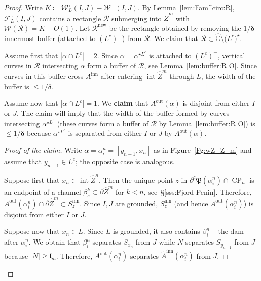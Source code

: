\documentclass{amsart}
\newcommand{\1}{{\mathbb 1 }}
\newcommand{\Fam}{{\mathcal F}}
\newcommand{\Width}{{\mathcal W}}
\newcommand\RR{\mathcal{R}}
\newcommand\intr{\operatorname{int}}
\newcommand{\wZ}{{\widehat Z}}
\newcommand{\str}{{\star}}
\newcommand{\length}{{\mathfrak l}}
\newcommand\inn{{\operatorname{inn}}}
\newcommand\out{{\operatorname{out}}}
\newcommand\new{{\operatorname{new}}}
\newcommand{\wC}{\widehat{\mathbb{C}}}
\theoremstyle{remark}
\numberwithin{equation}{section}
\theoremstyle{definition}
\newcommand{\Penin}{{\mathfrak P}}
\newcommand{\CP}{{\operatorname{CP}}}
\newcommand{\bdelta}{{\boldsymbol{ \delta}}}
\begin{document}
\begin{proof} Write $K\coloneqq\Width^\circ_L(I,J)-\Width^+(I,J)$. By Lemma~\ref{lem:Fam^circ:R}, $\Fam^\circ_L(I,J)$ contains a rectangle $\RR$ submerging into $\wZ^m$ with $\Width(\RR)=K-O(1)$. Let $\RR^\new$ be the rectangle obtained by removing the $1/\bdelta$ innermost buffer (attached to $(L^c)^-$) from $\RR$. We claim that $\RR\subset \wC \setminus \big(L^c\big)^{\str}$.  

Assume first that $|\alpha\cap L^c|=2$. Since $\alpha=\alpha^{\str L^c}$ is attached to $(L^c)^-$, vertical curves in $\RR$ intersecting $\alpha$ form a buffer of $\RR$, see Lemma~\ref{lem:buffer:R O}. Since curves in this buffer cross $A^\inn$ after entering $\intr \wZ^m$ through $L$, the width of the buffer is $\le 1/\delta$.  

Assume now that $|\alpha\cap L^c|=1$. We {\bf claim} that $A^\out(\alpha)$ is disjoint from either $I$ or $J$. The claim will imply that the width of the buffer formed by curves intersecting $\alpha^{\str L^c}$ (these curves form a buffer of $\RR$ by Lemma~\ref{lem:buffer:R O}) is $\le 1/\bdelta$ because $\alpha^{\str L^c}$ is separated from either $I$ or $J$ by  $A^\out(\alpha)$.

\begin{proof}[Proof of the claim] Write $\alpha=\alpha^n_i=[y_{n-1},x_n]$ as in Figure~\ref{Fg:wZ_Z_m} and assume that $y_{n-1}\in L^c$; the  opposite case is analogous.

 Suppose first that $x_n\in \intr \wZ^n$. Then the unique point $z$ in $\partial^c\Penin (\alpha^n_i)\cap \CP_n$ is an endpoint of a channel $\beta^k_s\subset \partial \wZ^m$ for $k<n$, see~\S\ref{sss:Fjord Penin}. Therefore, $A^\out(\alpha^n_i)\cap \partial \wZ^m\subset S^\inn_z$. Since $I, J$ are grounded, $ S^\inn_z$ (and hence $A^\out(\alpha^n_i)$) is disjoint from either $I$ or $J$.
 
 Suppose now that $x_n\in L$. Since $L$ is grounded, it also contains $\beta^n_{i}$ -- the dam after $\alpha^n_i$. We obtain that $\beta^n_{i}$ separates $S_{x_n}$ from $J$ while $N$ separates $S_{y_{n-1}}$ from $J$ because $|N|\ge \length_m$. Therefore, $A^\out(\alpha^n_i)$ separates $\widetilde A^\inn(\alpha^n_i)$ from $J$.
\end{proof}
\end{proof}
\end{document}
